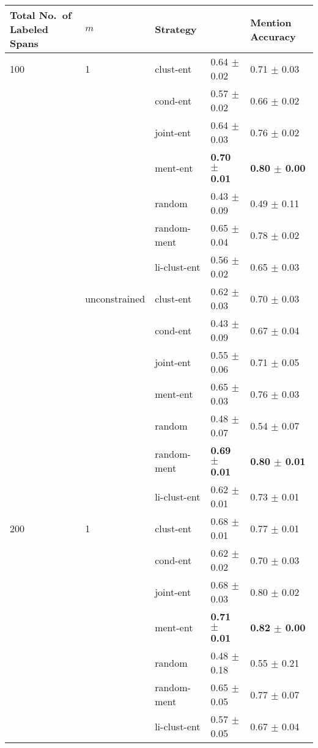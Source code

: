 \begin{table*}
    \centering
\begin{tabular}{lllll}
\toprule
    Total No.~of Labeled Spans & $m$ & Strategy & \avgfone{} & Mention Accuracy \\
\midrule
100 & 1 & clust-ent &  0.64 $\pm$ 0.02 &  0.71 $\pm$ 0.03 \\
    &               & cond-ent &  0.57 $\pm$ 0.02 &  0.66 $\pm$ 0.02 \\
    &               & joint-ent &  0.64 $\pm$ 0.03 &  0.76 $\pm$ 0.02 \\
    &               & ment-ent &  \textbf{0.70 $\pm$ 0.01} &  \textbf{0.80 $\pm$ 0.00} \\
    &               & random &  0.43 $\pm$ 0.09 &  0.49 $\pm$ 0.11 \\
    &               & random-ment &  0.65 $\pm$ 0.04 &  0.78 $\pm$ 0.02 \\
    &               & li-clust-ent &  0.56 $\pm$ 0.02 &  0.65 $\pm$ 0.03 \\
    \cline{2-5}
    & unconstrained & clust-ent &  0.62 $\pm$ 0.03 &  0.70 $\pm$ 0.03 \\
    &               & cond-ent &  0.43 $\pm$ 0.09 &  0.67 $\pm$ 0.04 \\
    &               & joint-ent &  0.55 $\pm$ 0.06 &  0.71 $\pm$ 0.05 \\
    &               & ment-ent &  0.65 $\pm$ 0.03 &  0.76 $\pm$ 0.03 \\
    &               & random &  0.48 $\pm$ 0.07 &  0.54 $\pm$ 0.07 \\
    &               & random-ment &  \textbf{0.69 $\pm$ 0.01} &  \textbf{0.80 $\pm$ 0.01} \\
    &               & li-clust-ent &  0.62 $\pm$ 0.01 &  0.73 $\pm$ 0.01 \\
    \cline{1-5}
200 & 1 & clust-ent &  0.68 $\pm$ 0.01 &  0.77 $\pm$ 0.01 \\
    &               & cond-ent &  0.62 $\pm$ 0.02 &  0.70 $\pm$ 0.03 \\
    &               & joint-ent &  0.68 $\pm$ 0.03 &  0.80 $\pm$ 0.02 \\
    &               & ment-ent &  \textbf{0.71 $\pm$ 0.01} &  \textbf{0.82 $\pm$ 0.00} \\
    &               & random &  0.48 $\pm$ 0.18 &  0.55 $\pm$ 0.21 \\
    &               & random-ment &  0.65 $\pm$ 0.05 &  0.77 $\pm$ 0.07 \\
    &               & li-clust-ent &  0.57 $\pm$ 0.05 &  0.67 $\pm$ 0.04 \\

\end{tabular}
\end{table*}
